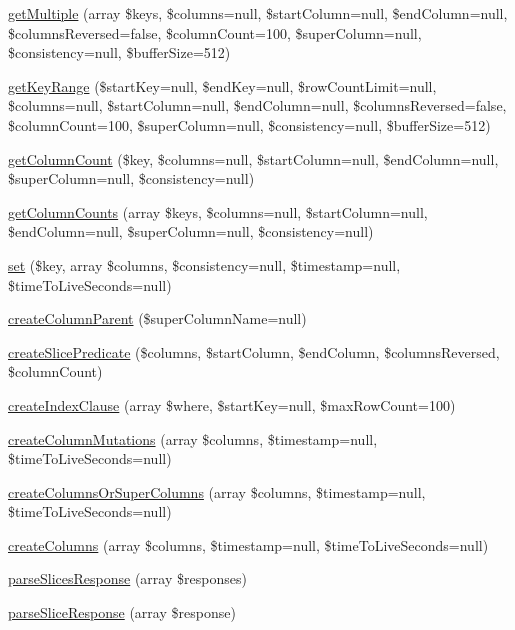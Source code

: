 \begin{DoxyCompactItemize}
\item 
\hyperlink{classCassandraColumnFamily_ac8ac7a1d976bd196678b6985cc93be43}{getMultiple} (array \$keys, \$columns=null, \$startColumn=null, \$endColumn=null, \$columnsReversed=false, \$columnCount=100, \$superColumn=null, \$consistency=null, \$bufferSize=512)
\item 
\hyperlink{classCassandraColumnFamily_a327a88ea26f58c75de804a82a2087935}{getKeyRange} (\$startKey=null, \$endKey=null, \$rowCountLimit=null, \$columns=null, \$startColumn=null, \$endColumn=null, \$columnsReversed=false, \$columnCount=100, \$superColumn=null, \$consistency=null, \$bufferSize=512)
\item 
\hyperlink{classCassandraColumnFamily_acf742fffdda67cc5e94e984b07def395}{getColumnCount} (\$key, \$columns=null, \$startColumn=null, \$endColumn=null, \$superColumn=null, \$consistency=null)
\item 
\hyperlink{classCassandraColumnFamily_a3b2f42e92f480eb254a331431208bd55}{getColumnCounts} (array \$keys, \$columns=null, \$startColumn=null, \$endColumn=null, \$superColumn=null, \$consistency=null)
\item 
\hyperlink{classCassandraColumnFamily_ac454829a16d93dbfeab3227a7c25c21b}{set} (\$key, array \$columns, \$consistency=null, \$timestamp=null, \$timeToLiveSeconds=null)
\item 
\hyperlink{classCassandraColumnFamily_a24a18b8d29af8c47ee94b1795667e51c}{createColumnParent} (\$superColumnName=null)
\item 
\hyperlink{classCassandraColumnFamily_a2ffef14e39bbe06dc8dc04638941268d}{createSlicePredicate} (\$columns, \$startColumn, \$endColumn, \$columnsReversed, \$columnCount)
\item 
\hyperlink{classCassandraColumnFamily_a7996d424367e08607847f14f93006cb6}{createIndexClause} (array \$where, \$startKey=null, \$maxRowCount=100)
\item 
\hyperlink{classCassandraColumnFamily_a064cc8504629412967fbd51f7b2ea142}{createColumnMutations} (array \$columns, \$timestamp=null, \$timeToLiveSeconds=null)
\item 
\hyperlink{classCassandraColumnFamily_adaf083d46ade0120f269254ef8c011cf}{createColumnsOrSuperColumns} (array \$columns, \$timestamp=null, \$timeToLiveSeconds=null)
\item 
\hyperlink{classCassandraColumnFamily_a6cb541d3f68ed99bc8c53725f4d95d2c}{createColumns} (array \$columns, \$timestamp=null, \$timeToLiveSeconds=null)
\item 
\hyperlink{classCassandraColumnFamily_ae6c7410e7f68a51900a76f807531e062}{parseSlicesResponse} (array \$responses)
\item 
\hyperlink{classCassandraColumnFamily_a10f09668871103443fbbe9f6747a95f8}{parseSliceResponse} (array \$response)
\end{DoxyCompactItemize}

